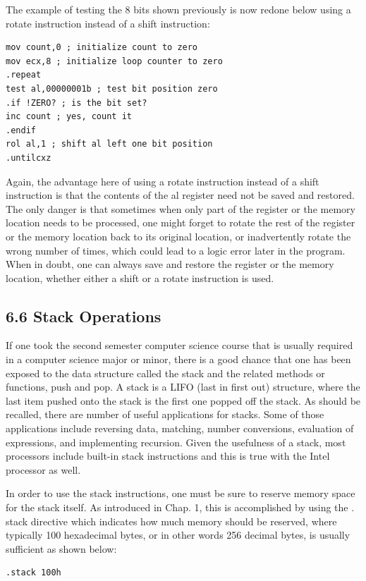 \documentclass[10pt]{book}
\begin{document}
\begin{center}
\begin{center}
The example of testing the 8 bits shown previously is now redone below using a rotate instruction instead of a shift instruction:

\begin{verbatim}
mov count,0 ; initialize count to zero
mov ecx,8 ; initialize loop counter to zero
.repeat
test al,00000001b ; test bit position zero
.if !ZERO? ; is the bit set?
inc count ; yes, count it
.endif
rol al,1 ; shift al left one bit position
.untilcxz
\end{verbatim}

Again, the advantage here of using a rotate instruction instead of a shift instruction is that the contents of the al register need not be saved and restored. The only danger is that sometimes when only part of the register or the memory location needs to be processed, one might forget to rotate the rest of the register or the memory location back to its original location, or inadvertently rotate the wrong number of times, which could lead to a logic error later in the program. When in doubt, one can always save and restore the register or the memory location, whether either a shift or a rotate instruction is used.

\subsection*{6.6 Stack Operations}
If one took the second semester computer science course that is usually required in a computer science major or minor, there is a good chance that one has been exposed to the data structure called the stack and the related methods or functions, push and pop. A stack is a LIFO (last in first out) structure, where the last item pushed onto the stack is the first one popped off the stack. As should be recalled, there are number of useful applications for stacks. Some of those applications include reversing data, matching, number conversions, evaluation of expressions, and implementing recursion. Given the usefulness of a stack, most processors include built-in stack instructions and this is true with the Intel processor as well.

In order to use the stack instructions, one must be sure to reserve memory space for the stack itself. As introduced in Chap. 1, this is accomplished by using the . stack directive which indicates how much memory should be reserved, where typically 100 hexadecimal bytes, or in other words 256 decimal bytes, is usually sufficient as shown below:

\begin{verbatim}
.stack 100h
\end{verbatim}


\end{center}
\end{center}
\end{document}
